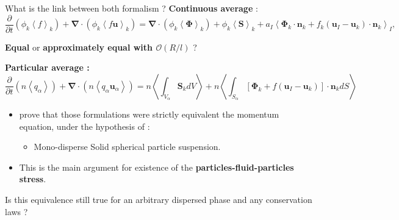 \documentclass{sintefbeamer}
\newcommand{\kavg}[1]{\left<#1\right>_k}
\newcommand{\Iavg}[1]{\left<#1\right>_I}
\newcommand{\pavg}[1]{n \left<#1\right>}
\newcommand{\nablab}{\bm{\nabla}}
\newcommand{\pddt}{\frac{\partial}{\partial t}}
\begin{document}
\begin{frame}{What is the link between both formalism ?}
  \textbf{Continuous average} :
  \begin{equation*}
      \pddt (\phi_k\kavg{f})
      + \nablab \cdot \left(
          \phi_k \kavg{f \textbf{u}}
      \right)
      = \nablab \cdot \left(
          \phi_k \kavg{\bm{\Phi}}
      \right)
      + \phi_k \kavg{\textbf{S}}
      + a_I \Iavg{
          \bm{\Phi}_k \cdot \textbf{n}_k
          + f_k 
          \left(
              \textbf{u}_I
              - \textbf{u}_k
          \right) \cdot \textbf{n}_k
      },
      \label{eq:avg_k_global}
  \end{equation*}
  \begin{center}
    \color{red}
    \textbf{Equal }
    or 
    \textbf{approximately equal with $\mathcal{O}(R/l)$} ?
  \end{center}
  \textbf{Particular average :}
  \begin{equation*}
    \pddt   \left(\pavg{q_\alpha}\right)
    + \nablab \cdot \left(\pavg{q_\alpha \textbf{u}_\alpha}\right) 
    = \pavg{\int_{V_\alpha} \textbf{S}_k dV}
    + \pavg{\int_{S_\alpha} \left[\bm{\Phi}_k + f (\textbf{u}_I-\textbf{u}_k) \right] \cdot \textbf{n}_k d S}
\end{equation*}
\begin{itemize}
  \item \citet{nott2011suspension} prove that those formulations were strictly equivalent the momentum equation, under the hypothesis of :
  \begin{itemize}
    \item Mono-disperse Solid spherical particle suspension.
  \end{itemize}
  \item This is the main argument for existence of the \textbf{particles-fluid-particles stress}.
\end{itemize}

Is this equivalence still true for an arbitrary dispersed phase and any conservation laws ?
\end{frame}
\end{document}
